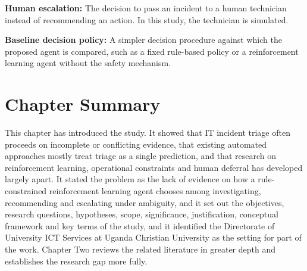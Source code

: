 \documentclass[12pt,a4paper]{article}
\begin{document}
\textbf{Human escalation:} The decision to pass an incident to a human technician instead of recommending an action. In this study, the technician is simulated.

\textbf{Baseline decision policy:} A simpler decision procedure against which the proposed agent is compared, such as a fixed rule-based policy or a reinforcement learning agent without the safety mechanism.

\section{Chapter Summary}

This chapter has introduced the study. It showed that IT incident triage often proceeds on incomplete or conflicting evidence, that existing automated approaches mostly treat triage as a single prediction, and that research on reinforcement learning, operational constraints and human deferral has developed largely apart. It stated the problem as the lack of evidence on how a rule-constrained reinforcement learning agent chooses among investigating, recommending and escalating under ambiguity, and it set out the objectives, research questions, hypotheses, scope, significance, justification, conceptual framework and key terms of the study, and it identified the Directorate of University ICT Services at Uganda Christian University as the setting for part of the work. Chapter Two reviews the related literature in greater depth and establishes the research gap more fully.
\end{document}
